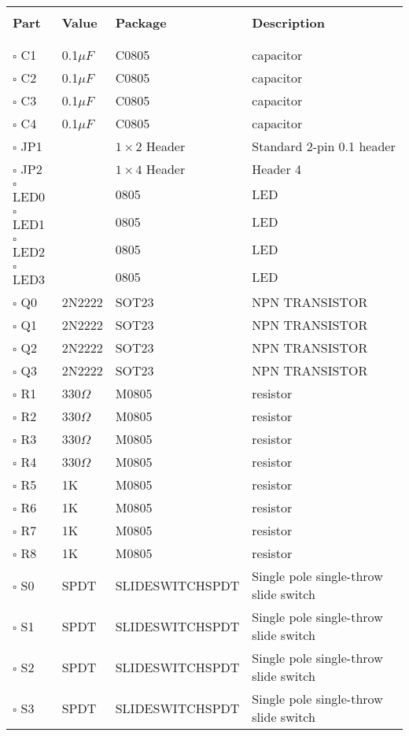 \begin{tabular}{l l l p{2.9in} } 
\hline\\
\textbf{Part} & \textbf{Value} & \textbf{Package} & \textbf{Description} \\[3mm]
\hline\\\\[-7mm]
$\square$ C1 & 0.1$\mu F$ & C0805 & capacitor \\
$\square$ C2 & 0.1$\mu F$ & C0805 & capacitor \\
$\square$ C3 & 0.1$\mu F$ & C0805 & capacitor \\
$\square$ C4 & 0.1$\mu F$ & C0805 & capacitor \\
$\square$ JP1 &  & $1 \times 2$ Header & Standard 2-pin 0.1 header \\
$\square$ JP2 &  & $1 \times 4$ Header & Header 4 \\
$\square$ LED0 &  & 0805 & LED \\
$\square$ LED1 &  & 0805 & LED \\
$\square$ LED2 &  & 0805 & LED \\
$\square$ LED3 &  & 0805 & LED \\
$\square$ Q0 & 2N2222 & SOT23 & NPN TRANSISTOR \\
$\square$ Q1 & 2N2222 & SOT23 & NPN TRANSISTOR \\
$\square$ Q2 & 2N2222 & SOT23 & NPN TRANSISTOR \\
$\square$ Q3 & 2N2222 & SOT23 & NPN TRANSISTOR \\
$\square$ R1 & 330$\Omega$ & M0805 & resistor \\
$\square$ R2 & 330$\Omega$ & M0805 & resistor \\
$\square$ R3 & 330$\Omega$ & M0805 & resistor \\
$\square$ R4 & 330$\Omega$ & M0805 & resistor \\
$\square$ R5 & 1K & M0805 & resistor \\
$\square$ R6 & 1K & M0805 & resistor \\
$\square$ R7 & 1K & M0805 & resistor \\
$\square$ R8 & 1K & M0805 & resistor \\
$\square$ S0 & SPDT & SLIDESWITCHSPDT & Single pole single-throw slide switch \\
$\square$ S1 & SPDT & SLIDESWITCHSPDT & Single pole single-throw slide switch \\
$\square$ S2 & SPDT & SLIDESWITCHSPDT & Single pole single-throw slide switch \\
$\square$ S3 & SPDT & SLIDESWITCHSPDT & Single pole single-throw slide switch \\
\end{tabular}

